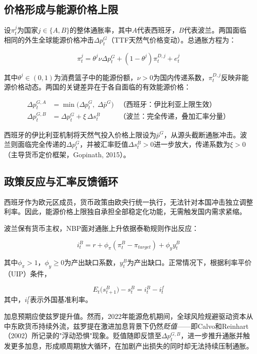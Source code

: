 \documentclass[12pt, a4paper]{article}
\begin{document}
\subsection{价格形成与能源价格上限}

设$\pi_t^j$为国家$j \in \{A, B\}$的整体通胀率，其中$A$代表西班牙，$B$代表波兰。两国面临相同的外生全球能源价格冲击$\Delta p_t^G$（TTF天然气价格变动）。总通胀方程为：

\[
\pi_t^j = \theta^j \nu \Delta p_t^{G} + (1 - \theta^j)\pi_t^{D,j} + e_t^j
\]

其中$\theta^j \in (0,1)$为消费篮子中的能源份额，$\nu > 0$为国内传递系数，$\pi_t^{D,j}$反映非能源价格动态。两国的关键差异在于各自面临的有效能源价格：

\begin{align*}
\Delta p_t^{G,A} &= \min\!\bigl(\Delta p_t^G,\;\Delta \bar{p}^G\bigr)
  & \text{（西班牙：伊比利亚上限生效）}\\[4pt]
\Delta p_t^{G,B} &= \Delta p_t^G + \xi\,\Delta s_t^B
  & \text{（波兰：完全传递，叠加汇率分量）}
\end{align*}

西班牙的伊比利亚机制将天然气投入价格上限设为$\bar{p}^G$，从源头截断通胀冲击。波兰则面临完全传递的$\Delta p_t^G$，并被汇率贬值$\Delta s_t^B > 0$进一步放大，传递系数为$\xi > 0$（主导货币定价框架，Gopinath, 2015）。


\subsection{政策反应与汇率反馈循环}

西班牙作为欧元区成员，货币政策由欧央行统一执行，无法针对本国冲击独立调整利率。因此，能源价格上限独自承担全部稳定化功能，无需触发国内需求紧缩。

波兰保有货币主权，NBP面对通胀上升依据泰勒规则作出反应：

\[
i_t^B = r + \phi_\pi(\pi_t^B - \pi_{target}) + \phi_y y_t^B
\]

其中$\phi_\pi > 1$，$\phi_y \geq 0$为产出缺口系数，$y_t^B$为产出缺口。正常情况下，根据利率平价（UIP）条件，

\[
E_t\bigl(s_{t+1}^{B}\bigr) - s_t^{B} = i_t^{B} - i_t^{f}
\]
其中，$i_t^{f}$表示外国基准利率。

加息预期应使兹罗提升值。然而，2022年能源危机期间，全球风险规避驱动资本从中东欧货币持续外流，兹罗提在激进加息背景下仍然\textit{贬值}——即Calvo和Reinhart（2002）所记录的"浮动恐惧"现象。贬值随即反馈至$\Delta p_t^{G,B}$，进一步推升通胀并触发更多加息，形成顺周期放大循环，在加剧产出损失的同时却无法持续压制通胀。
\end{document}
